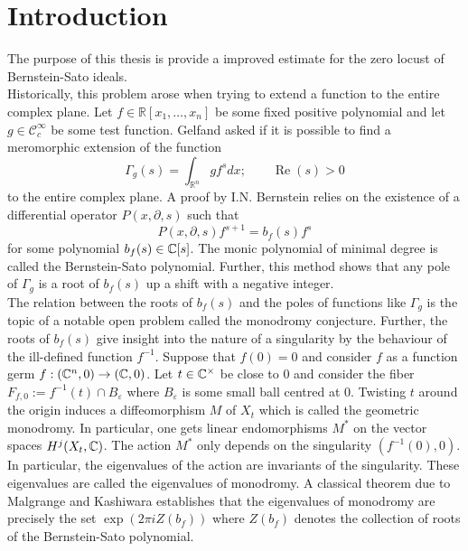 \chapter*{Introduction}\label{ch: Introduction} %



The purpose of this thesis is provide a improved estimate for the zero locust of Bernstein-Sato ideals.\\

Historically, this problem arose when trying to extend a function to the entire complex plane.
Let $f\in \mathbb{R}[x_1,\ldots,x_n]$ be some fixed positive polynomial and let $g \in \mathcal{C}_c^\infty$ be some test function.
Gelfand asked if it is possible to find a meromorphic extension of the function
$$\Gamma_g(s) = \int_{\mathbb{R}^n} g f^s dx; \qquad \operatorname{Re}(s)>0 $$
to the entire complex plane.
A proof by I.N. Bernstein relies on the existence of a differential operator $P(x,\partial, s)$ such that
$$P(x,\partial,s) f^{s+1} = b_f(s) f^s$$
for some polynomial $b_f(s)\in \mathbb{C}[s]$.
The monic polynomial of minimal degree is called the Bernstein-Sato polynomial.
Further, this method shows that any pole of $\Gamma_g$ is a root of $b_f(s)$ up a shift with a negative integer.\\

The relation between the roots of $b_f(s)$ and the poles of functions like $\Gamma_g$ is the topic of a notable open problem called the monodromy conjecture.
Further, the roots of $b_f(s)$ give insight into the nature of a singularity by the behaviour of the ill-defined function $f^{-1}$.
Suppose that $f(0)= 0$ and consider $f$ as a function germ $f:(\mathbb{C}^n,0)\to (\mathbb{C},0)$.
Let $t\in \mathbb{C}^\times$ be close to $0$ and consider the fiber $F_{f,0} := f^{-1}(t)\cap B_\varepsilon$ where $B_\varepsilon$ is some small ball centred at $0$.
Twisting $t$ around the origin induces a diffeomorphism $M$ of $X_t$ which is called the geometric monodromy.
In particular, one gets linear endomorphisms $M^*$ on the vector spaces $H^j(X_t,\mathbb{C})$.
The action $M^*$ only depends on the singularity $(f^{-1}(0),0)$.
In particular, the eigenvalues of the action are invariants of the singularity.
These eigenvalues are called the eigenvalues of monodromy.
A classical theorem due to Malgrange and Kashiwara establishes that the eigenvalues of monodromy are precisely the set $\exp(2\pi i Z(b_f))$ where $Z(b_f)$ denotes the collection of roots of the Bernstein-Sato polynomial.

